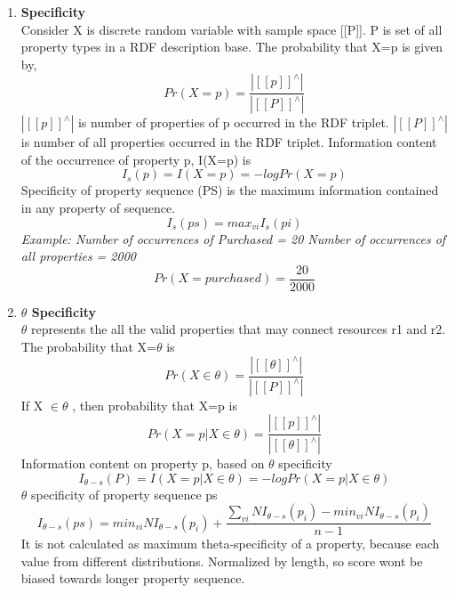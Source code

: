\begin{enumerate}
\item{\textbf{Specificity}}\\
Consider X is discrete random variable with sample space [[P]]. P is set of all property types in a RDF description base. The probability that X=p is given by,
	\begin{equation}
		Pr(X=p) = \frac{|[[p]]^{\wedge}|}{|[[P]]^{\wedge}|}
	\end{equation}
	$|[[p]]^{\wedge}|$ is number of properties of p occurred in the RDF triplet.
	$|[[P]]^{\wedge}|$ is number of all properties occurred in the RDF triplet. 
Information content of the occurrence of property p, I(X=p) is
	\begin{equation}
		I_{s}(p) = I(X=p) = -log Pr(X=p)
	\end{equation}
	Specificity of property sequence (PS) is the maximum information contained in any property of sequence.
	\begin{equation}
		I_{s}(ps) = max_{vi} I_{s}(pi)
	\end{equation}
	\textit{
	Example:
	Number of occurrences of \textit{Purchased} = 20 
	Number of occurrences of all properties = 2000
	\begin{equation}
		Pr(X=purchased) = \frac{20}{ 2000 }	
	\end{equation}
	}

	
\item{\textbf{$\theta$ Specificity}}\\
$\theta$ represents the all the valid properties that may connect resources r1 and r2. The probability that X=$\theta$ is 
	\begin{equation}
		Pr(X \in \theta) = \frac{|[[\theta]]^{\wedge}|}{|[[P]]^{\wedge}|}
	\end{equation}
If X $\in \theta$ , then probability that X=p is 
	\begin{equation}
		Pr(X=p | X \in \theta) = \frac{|[[p]]^{\wedge}|}{|[[\theta]]^{\wedge}|}
	\end{equation}
Information content on property p, based on $\theta$ specificity
	\begin{equation}
		I_{\theta-s}(P) =  I(X=p | X \in \theta) = - log Pr(X=p | X \in \theta)
	\end{equation}	
$\theta$ specificity of property sequence ps
\begin{equation}
	I_{\theta-s}(ps) = min_{vi}{NI_{\theta-s}(p_i)}  + \frac{\sum_{vi}{NI_{\theta-s}(p_i)} - min_{vi}{NI_{\theta-s}(p_i)} }{n-1}
\end{equation}
It is not calculated as maximum theta-specificity of a property, because each value from different distributions. Normalized by length, so score wont be biased towards longer property sequence.


\end{enumerate}
